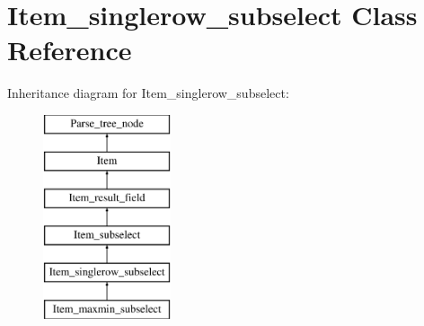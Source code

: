\hypertarget{classItem__singlerow__subselect}{}\section{Item\+\_\+singlerow\+\_\+subselect Class Reference}
\label{classItem__singlerow__subselect}
Inheritance diagram for Item\+\_\+singlerow\+\_\+subselect\+:\begin{figure}[H]
\begin{center}
\leavevmode
\includegraphics[height=6.000000cm]{classItem__singlerow__subselect}
\end{center}
\end{figure}

